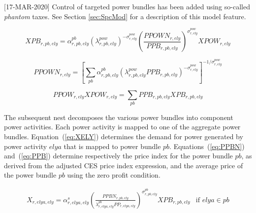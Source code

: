 \documentclass[11pt,letterpaper]{report}
\begin{document}
[17-MAR-2020] Control of targeted power bundles has been added
using so-called \emph{phantom} taxes. See Section \ref{sec:SpcMod}
for a description of this model feature.

\begin{equation}
\label{eq:XPB}
\mathit{XPB}_{r,\mathit{pb},\mathit{ely}} =
   \alpha^{\mathit{pb}}_{r,\mathit{pb},\mathit{ely}}
   \left( \lambda^{\mathit{pow}}_{r,\mathit{pb},\mathit{ely}}
   \right)^{-\sigma^{\mathit{pow}}_{r,\mathit{ely}}}
   \left( \frac {\mathit{PPOWN}_{r,\mathit{ely}}}
      {\mathit{PPB}_{r,\mathit{pb},\mathit{ely}}}
   \right)^{\sigma^{\mathit{pow}}_{r,\mathit{ely}}}
   \mathit{XPOW}_{r,\mathit{ely}}
\end{equation}

\begin{equation}
\label{eq:PPOWNDX}
\mathit{PPOWN}_{r,\mathit{ely}} =
   \left[
      \sum_{\mathit{pb}}{
         \alpha^{\mathit{pb}}_{r,\mathit{pb},\mathit{ely}}
         \left( {{\lambda^{\mathit{pow}}_{r,\mathit{pb},\mathit{ely}}}
            \mathit{PPB}_{r,\mathit{pb},\mathit{ely}}}
         \right)^{-\sigma^{\mathit{pow}}_{r,\mathit{ely}}}
      }
   \right]^{-1/\sigma^{\mathit{pow}}_{r,\mathit{ely}}}
\end{equation}

\begin{equation}
\label{eq:PPOW}
\mathit{PPOW}_{r,\mathit{ely}} \mathit{XPOW}_{r,\mathit{ely}} =
   \sum_{\mathit{pb}}{
      \mathit{PPB}_{r,\mathit{pb},\mathit{ely}}
      \mathit{XPB}_{r,\mathit{pb},\mathit{ely}}
   }
\end{equation}

The subsequent nest decomposes the various power bundles into component
power activities. Each power activity is mapped to one of the aggregate power
bundles. Equation~(\ref{eq:XELY}) determines the demand for power generated by
power activity $\mathit{elya}$ that is mapped to power bundle $\mathit{pb}$.
Equations~(\ref{eq:PPBN}) and~(\ref{eq:PPB}) determine respectively the price
index for the power bundle $\mathit{pb}$, as derived from the adjusted CES price
index expression, and the average price of the power bundle $\mathit{pb}$ using
the zero profit condition.

\begin{equation}
\label{eq:XELY}
\begin{array}{*{20}{l}}
   \mathit{X}_{r,\mathit{elya},\mathit{ely}} =
      \displaystyle \alpha^s_{r,\mathit{elya},\mathit{ely}}
      \left( \frac {\mathit{PPBN}_{r,\mathit{pb},\mathit{ely}}}
         {\lambda^{\mathit{pb}}_{r,\mathit{elya},\mathit{ely}}
            \mathit{PP}_{r,\mathit{elya},\mathit{ely}}}
      \right)^{\sigma^{\mathit{pb}}_{r,\mathit{pb},\mathit{ely}}}
      \mathit{XPB}_{r,\mathit{pb},\mathit{ely}}
   & \textrm{if } \mathit{elya} \in \mathit{pb}
\end{array}
\end{equation}
\end{document}
